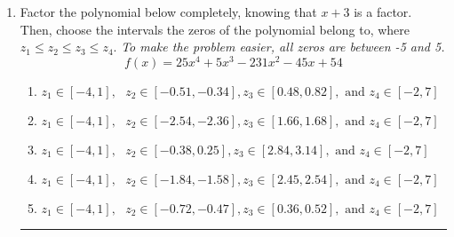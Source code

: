 \documentclass[14pt]{extbook}
\newcommand{\litem}[1]{\item#1\hspace*{-1cm}\rule{\textwidth}{0.4pt}}
\begin{document}
\begin{enumerate}
{\begin{enumerate}[label=\Alph*.]
\end{enumerate} }
\litem{
Factor the polynomial below completely, knowing that $x+3$ is a factor. Then, choose the intervals the zeros of the polynomial belong to, where $z_1 \leq z_2 \leq z_3 \leq z_4$. \textit{To make the problem easier, all zeros are between -5 and 5.}\[ f(x) = 25x^{4} +5 x^{3} -231 x^{2} -45 x + 54 \]\begin{enumerate}[label=\Alph*.]
\item \( z_1 \in [-4, 1], \text{   }  z_2 \in [-0.51, -0.34], z_3 \in [0.48, 0.82], \text{   and   } z_4 \in [-2, 7] \)
\item \( z_1 \in [-4, 1], \text{   }  z_2 \in [-2.54, -2.36], z_3 \in [1.66, 1.68], \text{   and   } z_4 \in [-2, 7] \)
\item \( z_1 \in [-4, 1], \text{   }  z_2 \in [-0.38, 0.25], z_3 \in [2.84, 3.14], \text{   and   } z_4 \in [-2, 7] \)
\item \( z_1 \in [-4, 1], \text{   }  z_2 \in [-1.84, -1.58], z_3 \in [2.45, 2.54], \text{   and   } z_4 \in [-2, 7] \)
\item \( z_1 \in [-4, 1], \text{   }  z_2 \in [-0.72, -0.47], z_3 \in [0.36, 0.52], \text{   and   } z_4 \in [-2, 7] \)

\end{enumerate} }
\end{enumerate}
\end{document}
